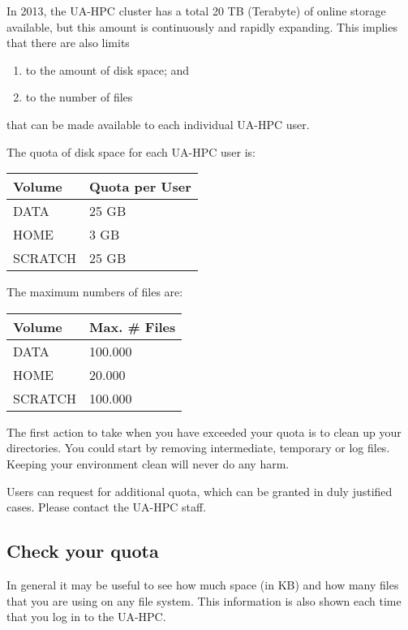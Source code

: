 In 2013, the UA-HPC cluster has a total 20 TB (Terabyte) of online storage available, but this amount is continuously and rapidly expanding. This implies that there are also limits

\begin{enumerate}
\item  to the amount of disk space; and
\item  to the number of files
\end{enumerate}

that can be made available to each individual UA-HPC user.

The quota of disk space for each UA-HPC user is:
\begin{tabular}{|p{0.6in}|p{1.0in}|} \hline
\textbf{Volume} & \textbf{Quota per User} \\ \hline
DATA & 25 GB \\ \hline
HOME & 3 GB \\ \hline
SCRATCH & 25 GB \\ \hline
\end{tabular}

The maximum numbers of files are:
\begin{tabular}{|p{0.6in}|p{1.0in}|} \hline
\textbf{Volume} & \textbf{Max. \# Files} \\ \hline
DATA & 100.000 \\ \hline
HOME & 20.000 \\ \hline
SCRATCH & 100.000 \\ \hline
\end{tabular}

 The first action to take when you have exceeded your quota is to clean up your directories. You could start by removing intermediate, temporary or log files.  Keeping your environment clean will never do any harm.

 Users can request for additional quota, which can be granted in duly justified cases. Please contact the UA-HPC staff.

\subsection{Check your quota}

In general it may be useful to see how much space (in KB) and how many files that you are using on any file system.  This information is also shown each time that you log in to the UA-HPC.



